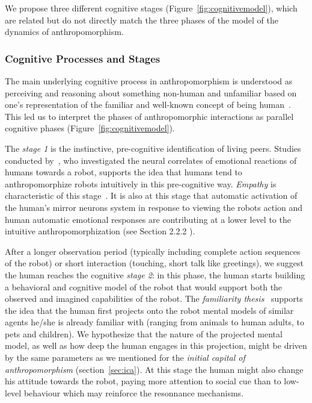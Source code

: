 \documentclass{frontiersSCNS} %
\begin{document}
We propose three different cognitive stages (Figure~\ref{fig:cognitivemodel}),
which are related but do not directly match the three phases of
the model of the dynamics of anthropomorphism.


\subsubsection{Cognitive Processes and Stages\\}

The main underlying cognitive process in anthropomorphism is understood as
perceiving and reasoning about something non-human and unfamiliar based on one's
representation of the familiar and well-known concept of being
human~\citep{epley_when_2008}. This led us to interpret the phases of
anthropomorphic interactions as parallel cognitive phases
(Figure~\ref{fig:cognitivemodel}).

The \emph{stage 1} is the instinctive, pre-cognitive identification of living
peers. Studies conducted by~\citet{rosenthal-vonderputten_experimental_2013},
who investigated the neural correlates of emotional reactions of humans towards
a robot, supports the idea that humans tend to anthropomorphize robots
intuitively in this pre-cognitive way. {\it Empathy} is characteristic of this
stage~\citep{rosenthalvonderPutten2013neural}.  It is also at this stage that
automatic activation of the human's mirror neurons system  in response to
viewing the robots action and human automatic emotional responses are
contributing at a lower level to the intuitive anthropomorphization (see Section
2.2.2 ).




After a longer observation period (typically including complete action sequences
of the robot) or short interaction (touching, short talk like greetings), we
suggest the human reaches the cognitive \emph{stage 2}: in this phase, the human
starts building a behavioral and cognitive model of the robot that would support
both the observed and imagined capabilities of the robot.  The \emph{familiarity
thesis}~\cite{hegel_understanding_2008} supports the idea that the human first
projects onto the robot mental models of similar agents he/she is already
familiar with (ranging from animals to human adults, to pets and children). We
hypothesize that the nature of the projected mental model, as well as how deep
the human engages in this projection, might be driven by the same parameters as
we mentioned for the \emph{initial capital of anthropomorphism}
(section~\ref{sec:ica}).  At this stage the human might also change his attitude
towards the robot, paying more attention to social cue than to low-level
behaviour which may reinforce the resonnance mechanisms. 
\end{document}

